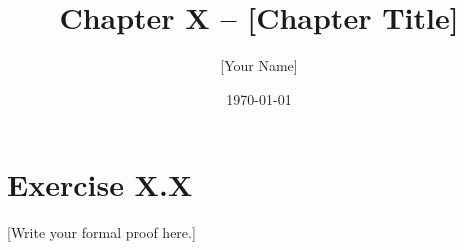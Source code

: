 \documentclass[12pt]{article}
\title{Chapter X – [Chapter Title]}
\author{[Your Name]}
\date{\today}
\begin{document}
\maketitle

\section*{Exercise X.X}
[Write your formal proof here.]
\end{document}
